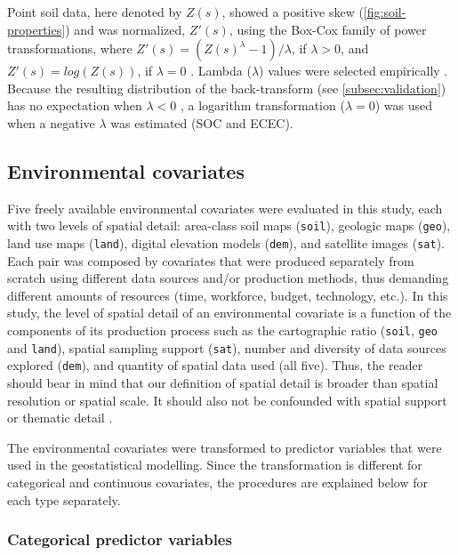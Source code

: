 Point soil data, here denoted by $Z(s)$, showed a positive skew (\autoref{fig:soil-properties}) and was 
normalized, $Z'(s)$, using the Box-Cox family of power transformations, where $Z'(s) = (Z(s)^{\lambda} - 1) / 
\lambda$, if $\lambda > 0$, and $Z'(s) = log(Z(s))$, if $\lambda = 0$ \cite{DiggleEtAl2007}. Lambda ($\lambda$) 
values were selected empirically \cite{FoxEtAl2011}. Because the resulting distribution of the back-transform 
(see \autoref{subsec:validation}) has no expectation when $\lambda<0$ \cite{RibeiroEtAl2001}, a logarithm 
transformation ($\lambda=0$) was used when a negative $\lambda$ was estimated (SOC and ECEC).

\subsection{Environmental covariates}
\label{subsec:sources}

Five freely available environmental covariates were evaluated in this study, each with two levels of spatial 
detail: area-class soil maps (\texttt{soil}), geologic maps (\texttt{geo}), land use maps (\texttt{land}), 
digital elevation models (\texttt{dem}), and satellite images (\texttt{sat}). Each pair was composed by 
covariates that were produced separately from scratch using different data sources and/or production methods, 
thus demanding different amounts of resources (time, workforce, budget, technology, etc.). In this study,
the level of spatial detail of an environmental covariate is a function of the components of its production 
process such as the cartographic ratio (\texttt{soil}, \texttt{geo} and \texttt{land}), spatial sampling 
support (\texttt{sat}), number and diversity of data sources explored (\texttt{dem}), and quantity of spatial 
data used (all five). Thus, the reader should bear in mind that our definition of spatial detail is broader 
than spatial resolution or spatial scale. It should also not be confounded with spatial support 
\cite{WebsterEtAl2007} or thematic detail \cite{Rossiter2000}.

The environmental covariates were transformed to predictor variables that were used in the geostatistical 
modelling. Since the transformation is different for categorical and continuous covariates, the procedures are 
explained below for each type separately.

\subsubsection*{Categorical predictor variables}
\label{subsubsec:categorical-covars}

